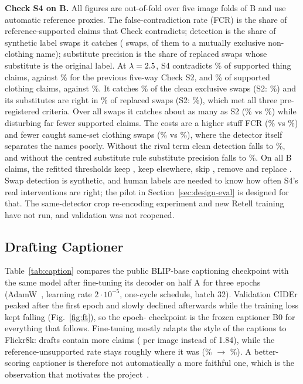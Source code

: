 \textbf{Check S4 on B.} All figures are out-of-fold over five image folds of B and use automatic reference proxies. The false-contradiction rate (FCR) is the share of reference-supported claims that Check contradicts; detection is the share of synthetic label swaps it catches (\CSSwaps{} swaps, \CSCleanSwaps{} of them to a mutually exclusive non-clothing name); substitute precision is the share of replaced swaps whose substitute is the original label. At $\lambda=2.5$, S4 contradicts \CSFcrThing\% of supported thing claims, against \CSTwoFcrThing\% for the previous five-way Check S2, and \CSFcrClothing\% of supported clothing claims, against \CSTwoFcrClothing\%. It catches \CSCleanDetect\% of the clean exclusive swaps (S2: \CSTwoCleanDetect\%) and its substitutes are right in \CSSubPrec\% of replaced swaps (S2: \CSTwoSubPrec\%), which met all three pre-registered criteria. Over all swaps it catches about as many as S2 (\CSAllDetect\% vs \CSTwoAllDetect\%) while disturbing far fewer supported claims. The costs are a higher stuff FCR (\CSFcrStuff\% vs \CSTwoFcrStuff\%) and fewer caught same-set clothing swaps (\CSClothDetect\% vs \CSTwoClothDetect\%), where the detector itself separates the names poorly. Without the rival term clean detection falls to \CSNoRivalClean\%, and without the centred substitute rule substitute precision falls to \CSUncentredSub\%. On all \CSClaims{} B claims, the refitted thresholds keep \CSKeep{}, keep \CSElsewhere{} elsewhere, skip \CSSkip{}, remove \CSRemove{} and replace \CSReplace{}. Swap detection is synthetic, and human labels are needed to know how often S4's real interventions are right; the pilot in Section~\ref{sec:design-eval} is designed for that. The same-detector crop re-encoding experiment and new Retell training have not run, and validation was not reopened.

\subsection{Drafting Captioner}
\label{sec:exp-captioner}
Table~\ref{tab:caption} compares the public BLIP-base captioning checkpoint with the same model after fine-tuning its decoder on half A for three epochs (AdamW~\cite{loshchilov2019decoupled}, learning rate $2\cdot10^{-5}$, one-cycle schedule, batch 32). Validation CIDEr peaked after the first epoch and slowly declined afterwards while the training loss kept falling (Fig.~\ref{fig:ft}), so the epoch-\FtBestEpoch{} checkpoint is the frozen captioner B0 for everything that follows. Fine-tuning mostly adapts the style of the captions to Flickr8k: drafts contain more claims (\ValClaimsPerImage{} per image instead of 1.84), while the reference-unsupported rate stays roughly where it was (\ZsRUOR\% $\to$ \FtRUOR\%). A better-scoring captioner is therefore not automatically a more faithful one, which is the observation that motivates the project~\cite{rohrbach2018object}.

